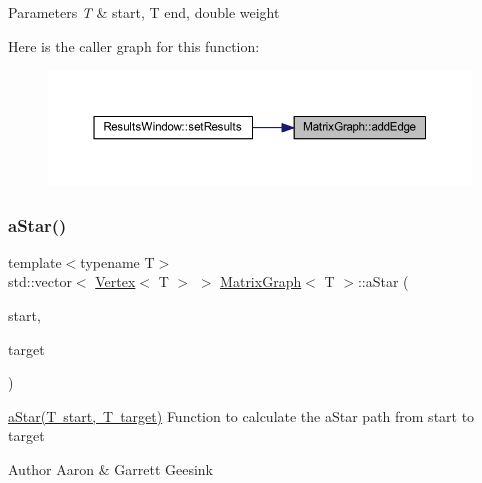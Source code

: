 \begin{DoxyParams}{Parameters}
{\em T} & start, T end, double weight \\
\hline
\end{DoxyParams}
Here is the caller graph for this function\+:
\nopagebreak
\begin{figure}[H]
\begin{center}
\leavevmode
\includegraphics[width=350pt]{class_matrix_graph_ac8410c5005729bdc4783429962446cad_icgraph}
\end{center}
\end{figure}
\mbox{\label{class_matrix_graph_a998736fb9402f7f40d97a60d8441c1ec}} 
\subsubsection{\texorpdfstring{aStar()}{aStar()}}
{\footnotesize\ttfamily template$<$typename T$>$ \\
std\+::vector$<$ \mbox{\hyperlink{struct_vertex}{Vertex}}$<$ T $>$ $>$ \mbox{\hyperlink{class_matrix_graph}{Matrix\+Graph}}$<$ T $>$\+::a\+Star (\begin{DoxyParamCaption}\item[{T}]{start,  }\item[{T}]{target }\end{DoxyParamCaption})}



\mbox{\hyperlink{class_matrix_graph_a998736fb9402f7f40d97a60d8441c1ec}{a\+Star(\+T start, T target)}} Function to calculate the a\+Star path from start to target 

\begin{DoxyAuthor}{Author}
Aaron \& Garrett Geesink 
\end{DoxyAuthor}

